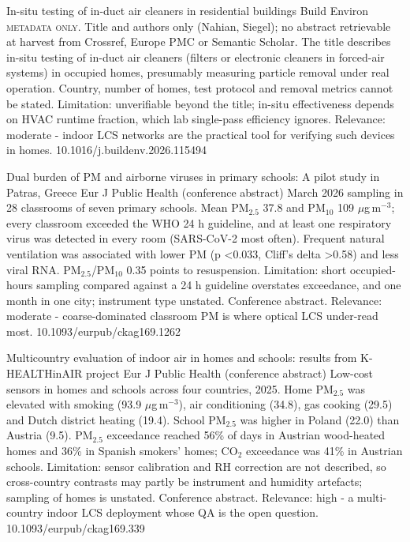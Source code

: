 \documentclass[10pt]{article}
\begin{document}
\par{}\baselineskip{}\baselineskip
{}

{In-situ testing of in-duct air cleaners in residential buildings}
{Build Environ}
{\textsc{metadata only.} Title and authors only (Nahian, Siegel); no abstract retrievable at harvest from Crossref, Europe PMC or Semantic Scholar. The title describes in-situ testing of in-duct air cleaners (filters or electronic cleaners in forced-air systems) in occupied homes, presumably measuring particle removal under real operation. Country, number of homes, test protocol and removal metrics cannot be stated. Limitation: unverifiable beyond the title; in-situ effectiveness depends on HVAC runtime fraction, which lab single-pass efficiency ignores. Relevance: moderate - indoor LCS networks are the practical tool for verifying such devices in homes.}
{10.1016/j.buildenv.2026.115494}

{Dual burden of PM and airborne viruses in primary schools: A pilot study in Patras, Greece}
{Eur J Public Health (conference abstract)}
{March 2026 sampling in 28 classrooms of seven primary schools. Mean PM$_{2.5}$ 37.8 and PM$_{10}$ 109 $\mu$g\,m$^{-3}$; every classroom exceeded the WHO 24 h guideline, and at least one respiratory virus was detected in every room (SARS-CoV-2 most often). Frequent natural ventilation was associated with lower PM (p <0.033, Cliff's delta >0.58) and less viral RNA. PM$_{2.5}$/PM$_{10}$ 0.35 points to resuspension. Limitation: short occupied-hours sampling compared against a 24 h guideline overstates exceedance, and one month in one city; instrument type unstated. Conference abstract. Relevance: moderate - coarse-dominated classroom PM is where optical LCS under-read most.}
{10.1093/eurpub/ckag169.1262}

{Multicountry evaluation of indoor air in homes and schools: results from K-HEALTHinAIR project}
{Eur J Public Health (conference abstract)}
{Low-cost sensors in homes and schools across four countries, 2025. Home PM$_{2.5}$ was elevated with smoking (93.9 $\mu$g\,m$^{-3}$), air conditioning (34.8), gas cooking (29.5) and Dutch district heating (19.4). School PM$_{2.5}$ was higher in Poland (22.0) than Austria (9.5). PM$_{2.5}$ exceedance reached 56\% of days in Austrian wood-heated homes and 36\% in Spanish smokers' homes; CO$_2$ exceedance was 41\% in Austrian schools. Limitation: sensor calibration and RH correction are not described, so cross-country contrasts may partly be instrument and humidity artefacts; sampling of homes is unstated. Conference abstract. Relevance: high - a multi-country indoor LCS deployment whose QA is the open question.}
{10.1093/eurpub/ckag169.339}
\end{document}

